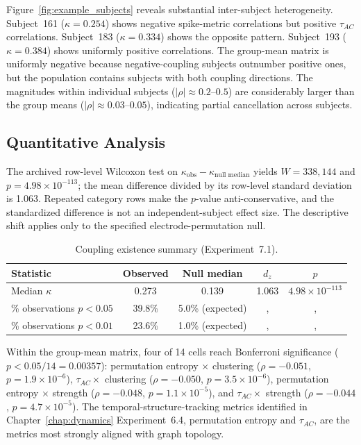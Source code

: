 Figure~\ref{fig:example_subjects} reveals substantial inter-subject heterogeneity. Subject~161 ($\kappa = 0.254$) shows negative spike-metric correlations but positive $\tau_{AC}$ correlations. Subject~183 ($\kappa = 0.334$) shows the opposite pattern. Subject~193 ($\kappa = 0.384$) shows uniformly positive correlations. The group-mean matrix is uniformly negative because negative-coupling subjects outnumber positive ones, but the population contains subjects with both coupling directions. The magnitudes within individual subjects ($|\rho| \approx 0.2$--$0.5$) are considerably larger than the group means ($|\rho| \approx 0.03$--$0.05$), indicating partial cancellation across subjects.

\subsection{Quantitative Analysis}

The archived row-level Wilcoxon test on $\kappa_{\text{obs}}-\kappa_{\text{null median}}$ yields $W=338{,}144$ and $p=4.98\times10^{-113}$; the mean difference divided by its row-level standard deviation is 1.063. Repeated category rows make the $p$-value anti-conservative, and the standardized difference is not an independent-subject effect size. The descriptive shift applies only to the specified electrode-permutation null.

\begin{table}[htbp]
\centering
\caption{Coupling existence summary (Experiment~7.1).}
\label{tab:coupling_existence}
\small
\begin{tabular}{lcccc}
\toprule
\textbf{Statistic} & \textbf{Observed} & \textbf{Null median} & \textbf{$d_z$} & \textbf{$p$} \\
\midrule
Median $\kappa$ & 0.273 & 0.139 & 1.063 & $4.98 \times 10^{-113}$ \\
\% observations $p < 0.05$ & 39.8\% & 5.0\% (expected) &, &, \\
\% observations $p < 0.01$ & 23.6\% & 1.0\% (expected) &, &, \\
\bottomrule
\end{tabular}
\end{table}

Within the group-mean matrix, four of 14 cells reach Bonferroni significance ($p < 0.05/14 = 0.00357$): permutation entropy $\times$ clustering ($\rho = -0.051$, $p = 1.9 \times 10^{-6}$), $\tau_{AC} \times$ clustering ($\rho = -0.050$, $p = 3.5 \times 10^{-6}$), permutation entropy $\times$ strength ($\rho = -0.048$, $p = 1.1 \times 10^{-5}$), and $\tau_{AC} \times$ strength ($\rho = -0.044$, $p = 4.7 \times 10^{-5}$). The temporal-structure-tracking metrics identified in Chapter~\ref{chap:dynamics} Experiment~6.4, permutation entropy and $\tau_{AC}$, are the metrics most strongly aligned with graph topology.

